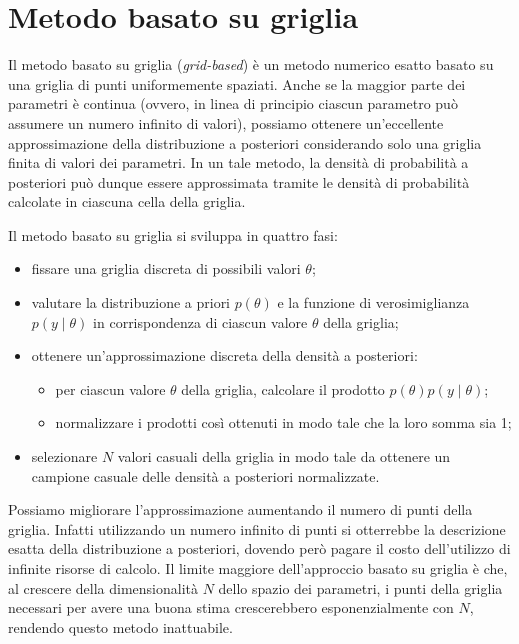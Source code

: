 \documentclass[
  11pt,
]{krantz}
\providecommand{\tightlist}{%
  \setlength{\itemsep}{0pt}\setlength{\parskip}{0pt}}
\theoremstyle{definition}
\theoremstyle{definition}
\theoremstyle{definition}
\theoremstyle{definition}
\theoremstyle{remark}
\begin{document}
\hypertarget{metodo-basato-su-griglia}{%
\section{Metodo basato su griglia}\label{metodo-basato-su-griglia}}

Il metodo basato su griglia (\emph{grid-based}) è un metodo numerico esatto basato su una griglia di punti uniformemente spaziati. Anche se la maggior parte dei parametri è continua (ovvero, in linea di principio ciascun parametro può assumere un numero infinito di valori), possiamo ottenere un'eccellente approssimazione della distribuzione a posteriori considerando solo una griglia finita di valori dei parametri. In un tale metodo, la densità di probabilità a posteriori può dunque essere approssimata tramite le densità di probabilità calcolate in ciascuna cella della griglia.

Il metodo basato su griglia si sviluppa in quattro fasi:

\begin{itemize}
\tightlist
\item
  fissare una griglia discreta di possibili valori \(\theta\);
\item
  valutare la distribuzione a priori \(p(\theta)\) e la funzione di verosimiglianza \(p(y \mid \theta)\) in corrispondenza di ciascun valore \(\theta\) della griglia;
\item
  ottenere un'approssimazione discreta della densità a posteriori:

  \begin{itemize}
  \tightlist
  \item
    per ciascun valore \(\theta\) della griglia, calcolare il prodotto \(p(\theta) p(y \mid \theta)\);
  \item
    normalizzare i prodotti così ottenuti in modo tale che la loro somma sia 1;
  \end{itemize}
\item
  selezionare \(N\) valori casuali della griglia in modo tale da ottenere un campione casuale delle densità a posteriori normalizzate.
\end{itemize}

Possiamo migliorare l'approssimazione aumentando il numero di punti della griglia. Infatti utilizzando un numero infinito di punti si otterrebbe la descrizione esatta della distribuzione a posteriori, dovendo però pagare il costo dell'utilizzo di infinite risorse di calcolo. Il limite maggiore dell'approccio basato su griglia è che, al crescere della dimensionalità \(N\) dello spazio dei parametri, i punti della griglia necessari per avere una buona stima crescerebbero esponenzialmente con \(N\), rendendo questo metodo inattuabile.
\end{document}
